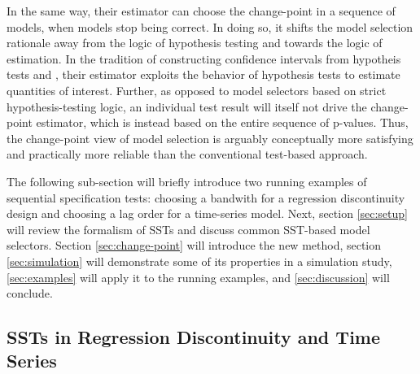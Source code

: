 \documentclass[12pt]{article}\usepackage[]{graphicx}\usepackage[]{color}
\begin{document}
In the same way, their estimator can choose the change-point in
a sequence of models, when models stop being correct.
In doing so, it shifts the model selection rationale away
from the logic of hypothesis testing and towards the logic of
estimation.
In the tradition of constructing confidence intervals from hypotheis
tests and \citet{hodgesLehmann}, their estimator exploits
the behavior of hypothesis tests to estimate quantities of interest.
Further, as opposed to model selectors based on strict
hypothesis-testing logic, an individual test result will itself not
drive the change-point estimator, which is instead based on the entire
sequence of p-values.
Thus, the change-point view of model selection is arguably conceptually
more satisfying and practically more reliable than the conventional
test-based approach.

The following sub-section will briefly introduce two running examples
of sequential specification tests: choosing a bandwith for a
regression discontinuity design and choosing a lag order for a
time-series model.
Next, section \ref{sec:setup} will review the formalism of SSTs and
discuss common SST-based model selectors.
Section \ref{sec:change-point} will introduce the new method, section
\ref{sec:simulation} will demonstrate some of its properties in a
simulation study, \ref{sec:examples} will apply it to the running
examples, and \ref{sec:discussion} will conclude.

\subsection{SSTs in Regression Discontinuity and Time Series}\label{sec:exampleIntro}
\end{document}
